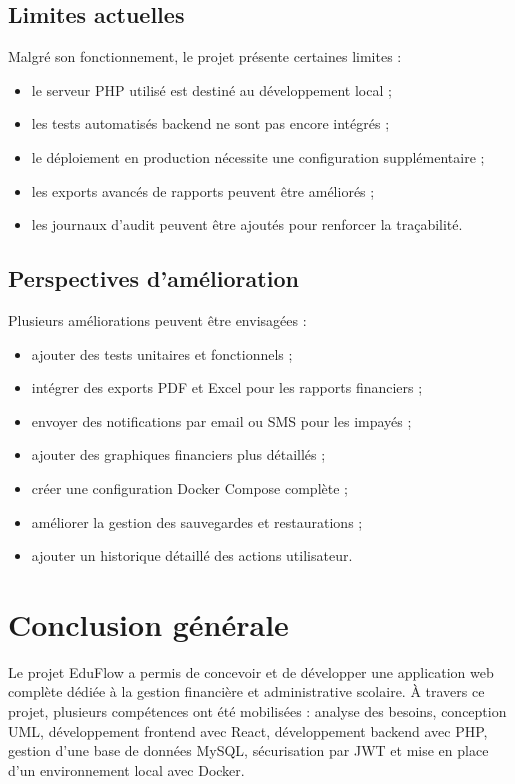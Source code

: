 \documentclass[12pt,a4paper]{report}
\begin{document}
\section{Limites actuelles}

Malgré son fonctionnement, le projet présente certaines limites :

\begin{itemize}[label=--]
    \item le serveur PHP utilisé est destiné au développement local ;
    \item les tests automatisés backend ne sont pas encore intégrés ;
    \item le déploiement en production nécessite une configuration supplémentaire ;
    \item les exports avancés de rapports peuvent être améliorés ;
    \item les journaux d'audit peuvent être ajoutés pour renforcer la traçabilité.
\end{itemize}

\section{Perspectives d'amélioration}

Plusieurs améliorations peuvent être envisagées :

\begin{itemize}[label=--]
    \item ajouter des tests unitaires et fonctionnels ;
    \item intégrer des exports PDF et Excel pour les rapports financiers ;
    \item envoyer des notifications par email ou SMS pour les impayés ;
    \item ajouter des graphiques financiers plus détaillés ;
    \item créer une configuration Docker Compose complète ;
    \item améliorer la gestion des sauvegardes et restaurations ;
    \item ajouter un historique détaillé des actions utilisateur.
\end{itemize}

\chapter*{Conclusion générale}

Le projet EduFlow a permis de concevoir et de développer une application web complète dédiée à la gestion financière et administrative scolaire. À travers ce projet, plusieurs compétences ont été mobilisées : analyse des besoins, conception UML, développement frontend avec React, développement backend avec PHP, gestion d'une base de données MySQL, sécurisation par JWT et mise en place d'un environnement local avec Docker.
\end{document}
